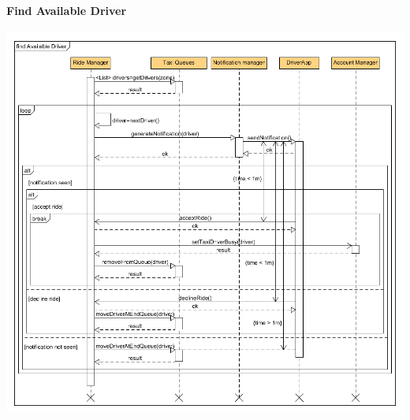 \newpage
\paragraph{Find Available Driver}

\begin{center}
	\includegraphics[width=\textwidth]{diagrams/availableDriver.png}
\end{center}
\newpage

